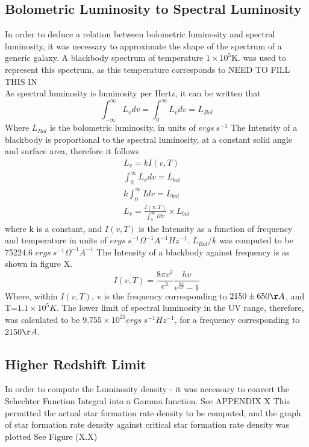 \documentclass[pdf,color]{UoBnote}
\begin{document}
\subsection{Bolometric Luminosity to Spectral Luminosity}
In order to deduce a relation between bolometric luminosity and spectral luminosity, it was necessary to approximate the shape of the spectrum of a generic galaxy. A blackbody spectrum of temperature $1\times 10^5$K. was used to represent this spectrum, as this temperature corresponds to NEED TO FILL THIS IN \\
\newline
As spectral luminosity is luminosity per Hertz, it can be written that
\begin{equation}
\int^{\infty}_{-\infty}L_v dv = \int^{\infty}_{0}L_v dv = L_{Bol}
\end{equation} 
Where $L_{Bol}$ is the bolometric luminosity, in units of $ergs \ s^{-1}$
The Intensity of a blackbody is proportional to the spectral luminosity, at a constant solid angle and surface area, therefore it follows 
\begin{eqnarray}
L_v= kI(v,T) \\
\int^{\infty}_{0}L_v dv=L_{bol} \\
k\int^{\infty}_{0}I dv=L_{bol} \\
L_v = \frac{I(v,T)}{\int^{\infty}_{0}I dv} \times L_{bol}
\end{eqnarray}
where k is a constant, and $I(v,T)$ is the Intensity as a function of frequency and temperature in units of $ergs \ s^{-1} \Omega^{-1} A^{-1} Hz^{-1}$. $L_{Bol}/k$ was computed to be 75224.6 $ergs \ s^{-1} \Omega^{-1} A^{-1}$ The Intensity of a blackbody against frequency is as shown in figure X.
\begin{equation}
I(v,T)=\frac{8\pi v^2}{c^3}\frac{hv}{e^\frac{hv}{kT}-1}
\end{equation}
Where, within $I(v,T)$, v is the frequency corresponding to $2150\pm 650 \AA$, and T=$1.1\times 10^5K$. The lower limit of spectral luminosity in the UV range, therefore, was calculated to be $9.755\times 10^{21} ergs \ s^{-1} Hz^{-1}$, for a frequency corresponding to 2150$\AA$.
\clearpage
\subsection{Higher Redshift Limit}
In order to compute the Luminosity density - it was necessary to convert the Schechter Function Integral into a Gamma function. See APPENDIX X
This permitted the actual star formation rate density to be computed, and the graph of star formation rate density against critical star formation rate density was plotted See Figure (X.X)
\end{document}
